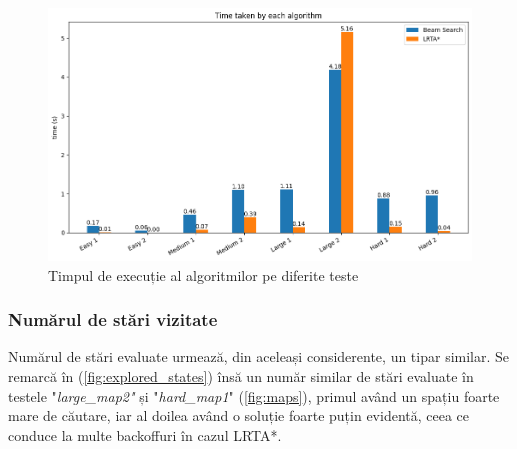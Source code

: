 \documentclass{article}
\begin{document}
\begin{figure}[ht]
    \includegraphics[scale=0.55]{solution/time.png}
    \caption{Timpul de execuție al algoritmilor pe diferite teste}
    \label{fig:time}
\end{figure}

\subsubsection*{Numărul de stări vizitate}
Numărul de stări evaluate urmează, din aceleași considerente, un tipar similar.
Se remarcă în (\ref{fig:explored_states}) însă un număr similar de stări 
evaluate în testele "\textit{large\_map2"} și "\textit{hard\_map1}" 
(\ref{fig:maps}), primul având un spațiu foarte mare de căutare, iar al doilea 
având o soluție foarte puțin evidentă, ceea ce conduce la multe backoffuri în 
cazul LRTA*.
\end{document}
